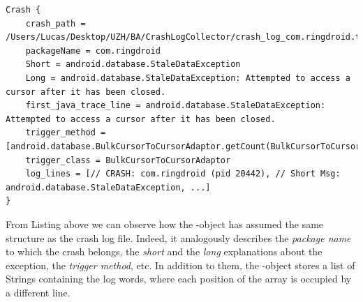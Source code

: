 \begin{lstlisting}[caption=\Crash-object,basicstyle=\fontsize{6}{8}\ttfamily, label={lst: crashobject}]
Crash {
	crash_path = /Users/Lucas/Desktop/UZH/BA/CrashLogCollector/crash_log_com.ringdroid.txt
	packageName = com.ringdroid
	Short = android.database.StaleDataException
	Long = android.database.StaleDataException: Attempted to access a cursor after it has been closed.
	first_java_trace_line = android.database.StaleDataException: Attempted to access a cursor after it has been closed.
	trigger_method = [android.database.BulkCursorToCursorAdaptor.getCount(BulkCursorToCursorAdaptor.java:70)]
	trigger_class = BulkCursorToCursorAdaptor
	log_lines = [// CRASH: com.ringdroid (pid 20442), // Short Msg: android.database.StaleDataException, ...]
}
\end{lstlisting}
From Listing above we can observe how the \Crash-object has assumed the same structure as the crash log file. Indeed, it analogously describes the \textit{package name} to which the crash belongs, the \textit{short} and the \textit{long} explanations about the exception, the \textit{trigger method}, etc.
In addition to them, the \Crash-object stores a list of Strings containing the log words, where each position of the array is occupied by a different line. 
